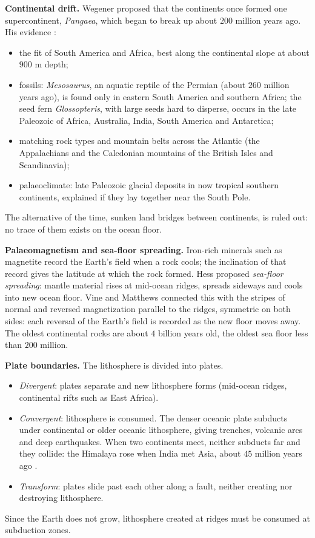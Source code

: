 \textbf{Continental drift.} Wegener proposed
that the continents once formed one
supercontinent, \emph{Pangaea}, which began
to break up about $200$ million years ago.
His evidence
\cite[Chapter 2]{tarbuckciencias}:
\begin{itemize}
\item the fit of South America and Africa,
best along the continental slope at about
$900$ m depth;
\item fossils: \emph{Mesosaurus}, an
aquatic reptile of the Permian (about
$260$ million years ago), is found only in
eastern South America and southern Africa;
the seed fern \emph{Glossopteris}, with
large seeds hard to disperse, occurs in the
late Paleozoic of Africa, Australia, India,
South America and Antarctica;
\item matching rock types and mountain
belts across the Atlantic (the
Appalachians and the Caledonian mountains
of the British Isles and Scandinavia);
\item palaeoclimate: late Paleozoic glacial
deposits in now tropical southern
continents, explained if they lay together
near the South Pole.
\end{itemize}
The alternative of the time, sunken land
bridges between continents, is ruled out:
no trace of them exists on the ocean floor.

\textbf{Palaeomagnetism and sea-floor
spreading.} Iron-rich minerals such as
magnetite record the Earth's field when a
rock cools; the inclination of that record
gives the latitude at which the rock
formed. Hess proposed \emph{sea-floor
spreading}: mantle material rises at
mid-ocean ridges, spreads sideways and cools
into new ocean floor. Vine and Matthews
connected this with the stripes of normal
and reversed magnetization parallel to the
ridges, symmetric on both sides: each
reversal of the Earth's field is recorded
as the new floor moves away. The oldest
continental rocks are about $4$ billion
years old, the oldest sea floor less than
$200$ million.

\textbf{Plate boundaries.} The lithosphere
is divided into plates.
\begin{itemize}
\item \emph{Divergent}: plates separate and
new lithosphere forms (mid-ocean ridges,
continental rifts such as East Africa).
\item \emph{Convergent}: lithosphere is
consumed. The denser oceanic plate
subducts under continental or older
oceanic lithosphere, giving trenches,
volcanic arcs and deep earthquakes. When
two continents meet, neither subducts far
and they collide: the Himalaya rose when
India met Asia, about $45$ million years
ago \cite[Chapter 2]{tarbuckciencias}.
\item \emph{Transform}: plates slide past
each other along a fault, neither creating
nor destroying lithosphere.
\end{itemize}
Since the Earth does not grow, lithosphere
created at ridges must be consumed at
subduction zones.

